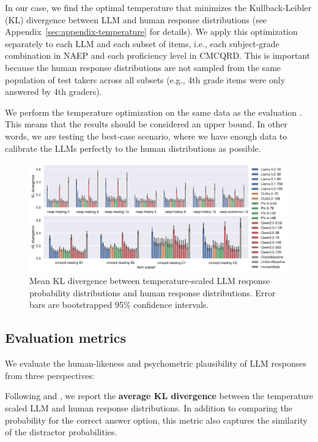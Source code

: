 \documentclass[11pt]{article}
\begin{document}
In our case, we find the optimal temperature that minimizes the Kullback-Leibler (KL) divergence between LLM and human response distributions (see Appendix~\ref{sec:appendix-temperature} for details). We apply this optimization separately to each LLM and each subset of items, i.e., each subject-grade combination in NAEP and each proficiency level in CMCQRD. This is important because the human response distributions are not sampled from the same population of test takers across all subsets (e.g., 4th grade items were only answered by 4th graders).

We perform the temperature optimization on the same data as the evaluation \citep[cf.][]{Baan2022,Liusie2023}. This means that the results should be considered an upper bound. In other words, we are testing the best-case scenario, where we have enough data to calibrate the LLMs perfectly to the human distributions as possible.

\begin{figure}
  \centering
  \includegraphics[width=\textwidth]{figures/kldiv-optimized.pdf}
  \caption{Mean KL divergence between temperature-scaled LLM response probability distributions and human response distributions. Error bars are bootstrapped 95\% confidence intervals.}
  \label{fig:kldiv-optimized}
\end{figure}

\subsection{Evaluation metrics}

We evaluate the human-likeness and psychometric plausibility of LLM responses from three perspectives:

Following \citet{Liusie2023} and \citet{Hayakawa2024}, we report the \textbf{average KL divergence} between the temperature scaled LLM and human response distributions. In addition to comparing the probability for the correct answer option, this metric also captures the similarity of the distractor probabilities.
\end{document}

